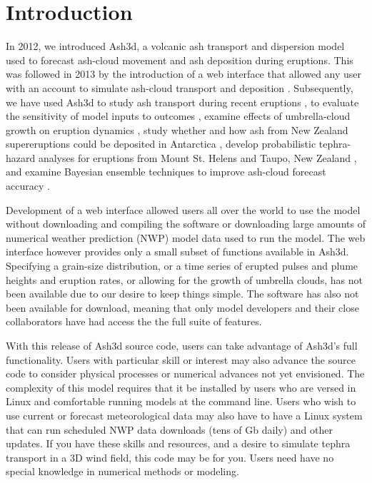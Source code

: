 \chapter{Introduction}\label{ChapIntro}
In 2012, we introduced Ash3d, a volcanic ash transport and dispersion model used to forecast ash-cloud movement and ash deposition during eruptions. \cite{Schwaiger12}  This was followed in 2013 by the introduction of a web interface that allowed any user with an account to simulate ash-cloud transport and deposition \cite{Mastin13}.  Subsequently, we have used Ash3d to study ash transport during recent eruptions \cite{Mastin13b} \cite{Mastin20}, to evaluate the sensitivity of model inputs to outcomes \cite{Mastin16}, examine effects of umbrella-cloud growth on eruption dynamics \cite{Mastin16},  study whether and how ash from New Zealand supereruptions could be deposited in Antarctica \cite{Dunbar17}, develop probabilistic tephra-hazard analyses for eruptions from Mount St. Helens \cite{Mastin20b} and Taupo, New Zealand \cite{Barker19}, and examine Bayesian ensemble techniques to improve ash-cloud forecast accuracy \cite{Denlinger12}.

Development of a web interface allowed users all over the world to use the model without downloading and compiling the software or downloading large amounts of numerical weather prediction (NWP) model data used to run the model.  The web interface however provides only a small subset of functions available in Ash3d.  Specifying a grain-size distribution, or a time series of erupted pulses and plume heights and eruption rates, or allowing for the growth of umbrella clouds, has not been available due to our desire to keep things simple.  The software has also not been available for download, meaning that only model developers and their close collaborators have had access the the full suite of features.

With this release of Ash3d source code, users can take advantage of Ash3d's full functionality.  Users with particular skill or interest may also advance the source code to consider physical processes or numerical advances not yet envisioned.  The complexity of this model requires that it be installed by users who are versed in Linux and comfortable running models at the command line.  Users who wish to use current or forecast meteorological data may also have to have a Linux system that can run scheduled NWP data downloads (tens of Gb daily) and other updates.  If you have these skills and resources, and a desire to simulate tephra transport in a 3D wind field, this code may be for you. Users need have no special knowledge in numerical methods or modeling.

